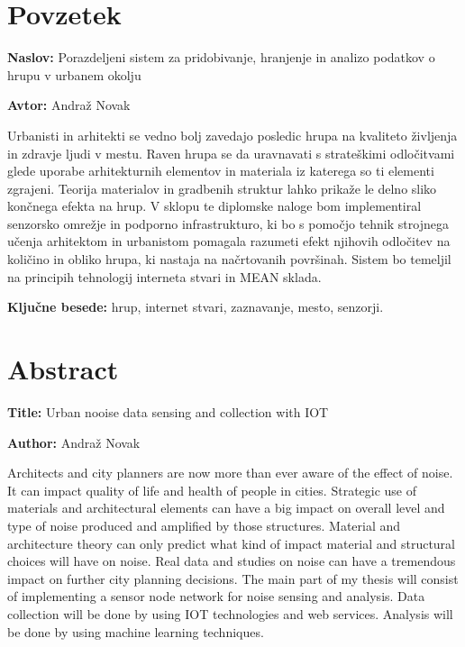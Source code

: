 \documentclass[a4paper, 12pt]{book}
\newcommand{\ttitle}{Porazdeljeni sistem za pridobivanje, hranjenje in analizo podatkov o hrupu v urbanem okolju}
\newcommand{\ttitleEn}{Urban nooise data sensing and collection with IOT}
\newcommand{\tauthor}{Andraž Novak}
\newcommand{\tkeywords}{hrup, internet stvari, zaznavanje, mesto, senzorji}
\newcommand{\clearemptydoublepage}{\newpage{\pagestyle{empty}\cleardoublepage}}
\begin{document}
\chapter*{Povzetek}

\noindent\textbf{Naslov:} \ttitle
\bigskip

\noindent\textbf{Avtor:} \tauthor
\bigskip

\noindent Urbanisti in arhitekti se vedno bolj zavedajo posledic hrupa na kvaliteto življenja in zdravje ljudi v mestu. 
Raven hrupa se da uravnavati s strateškimi odločitvami glede uporabe arhitekturnih elementov in materiala iz katerega so ti elementi zgrajeni. Teorija materialov in gradbenih struktur lahko prikaže le delno sliko končnega efekta na hrup. 
V sklopu te diplomske naloge bom implementiral senzorsko omrežje in podporno infrastrukturo, ki bo s pomočjo tehnik strojnega učenja arhitektom in urbanistom pomagala razumeti efekt njihovih odločitev na količino in obliko hrupa, ki nastaja na načrtovanih površinah. Sistem bo temeljil na principih tehnologij interneta stvari in MEAN sklada.
\bigskip

\noindent\textbf{Ključne besede:} \tkeywords.
\clearemptydoublepage

\chapter*{Abstract}

\noindent\textbf{Title:} \ttitleEn
\bigskip

\noindent\textbf{Author:} \tauthor
\bigskip

\noindent Architects and city planners are now more than ever aware of the effect of noise. It can impact quality of life and health of people in cities. Strategic use of materials and architectural elements can have a big impact on overall level and type of noise produced and amplified by those structures. Material and architecture theory can only predict what kind of impact material and structural choices will have on noise. Real data and studies on noise can have a tremendous impact on further city planning decisions. The main part of my thesis will consist of implementing a sensor node network for noise sensing and analysis. Data collection will be done by using IOT technologies and web services. Analysis will be done by using machine learning techniques. 
\bigskip
\end{document}
